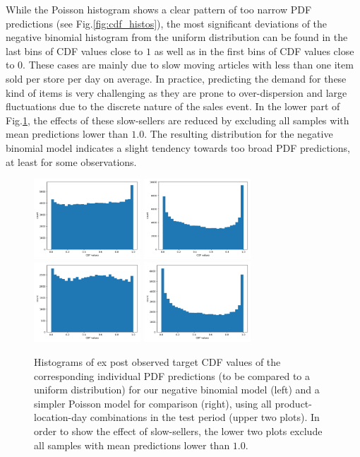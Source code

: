 \documentclass[BCOR=1mm, DIV=calc,10pt,
twoside=true,
twocolumn,
headings=normal]{scrartcl}
\newcommand{\fig}{Fig.}
\begin{document}
\noindent
While the Poisson histogram shows a clear pattern of too narrow PDF predictions (see \fig \ref{fig:cdf_histos}), the most significant deviations of the negative binomial histogram from the uniform distribution can be found in the last bins of CDF values close to $1$ as well as in the first bins of CDF values close to $0$. These cases are mainly due to slow moving articles with less than one item sold per store per day on average. In practice, predicting the demand for these kind of items is very challenging as they are prone to over-dispersion and large fluctuations due to the discrete nature of the sales event. In the lower part of \fig \ref{fig:cdf_demand}, the effects of these slow-sellers are reduced by excluding all samples with mean predictions lower than $1.0$. The resulting distribution for the negative binomial model indicates a slight tendency towards too broad PDF predictions, at least for some observations.

\begin{figure}
\begin{center}
\includegraphics[width=4cm]{../figures/cdf_truth_nbinom}
\includegraphics[width=4cm]{../figures/cdf_truth_poisson}
\includegraphics[width=4cm]{../figures/cdf_truth_nbinom_larger1}
\includegraphics[width=4cm]{../figures/cdf_truth_poisson_larger1}
\caption{\label{fig:cdf_demand} Histograms of ex post observed target CDF values of the corresponding individual PDF predictions (to be compared to a uniform distribution) for our negative binomial model (left) and a simpler Poisson model for comparison (right), using all product-location-day combinations in the test period (upper two plots). In order to show the effect of slow-sellers, the lower two plots exclude all samples with mean predictions lower than $1.0$.}
\end{center}
\end{figure}
\end{document}

